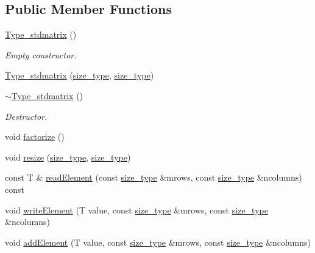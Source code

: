 \subsection*{Public Member Functions}
\begin{DoxyCompactItemize}
\item 
\hyperlink{classlmx_1_1Type__stdmatrix_a16876ff97d835d125990ac31b0e2dfcf}{Type\-\_\-stdmatrix} ()
\begin{DoxyCompactList}\small\item\em Empty constructor. \end{DoxyCompactList}\item 
\hyperlink{classlmx_1_1Type__stdmatrix_a104d1354bb30a767884614ae0fd6f2b5}{Type\-\_\-stdmatrix} (\hyperlink{lmx__mat__data_8h_a49b489a408a211a90e766329c0732d7b}{size\-\_\-type}, \hyperlink{lmx__mat__data_8h_a49b489a408a211a90e766329c0732d7b}{size\-\_\-type})
\item 
\hyperlink{classlmx_1_1Type__stdmatrix_a2f98496533ad90a0563e794af503d182}{$\sim$\-Type\-\_\-stdmatrix} ()
\begin{DoxyCompactList}\small\item\em Destructor. \end{DoxyCompactList}\item 
void \hyperlink{classlmx_1_1Type__stdmatrix_a84777801660805f7e6f1a93861d0c9ac}{factorize} ()
\item 
void \hyperlink{classlmx_1_1Type__stdmatrix_af434c9ba68d71f40e578230225ba828c}{resize} (\hyperlink{lmx__mat__data_8h_a49b489a408a211a90e766329c0732d7b}{size\-\_\-type}, \hyperlink{lmx__mat__data_8h_a49b489a408a211a90e766329c0732d7b}{size\-\_\-type})
\item 
const T \& \hyperlink{classlmx_1_1Type__stdmatrix_a7441d3f1a35bb8ebcdd99f7455186bcc}{read\-Element} (const \hyperlink{lmx__mat__data_8h_a49b489a408a211a90e766329c0732d7b}{size\-\_\-type} \&mrows, const \hyperlink{lmx__mat__data_8h_a49b489a408a211a90e766329c0732d7b}{size\-\_\-type} \&ncolumns) const 
\item 
void \hyperlink{classlmx_1_1Type__stdmatrix_a90b9f72528b9bd122463611c3628a18c}{write\-Element} (T value, const \hyperlink{lmx__mat__data_8h_a49b489a408a211a90e766329c0732d7b}{size\-\_\-type} \&mrows, const \hyperlink{lmx__mat__data_8h_a49b489a408a211a90e766329c0732d7b}{size\-\_\-type} \&ncolumns)
\item 
void \hyperlink{classlmx_1_1Type__stdmatrix_ad77ae15ae864751d41b57be6cb9d3279}{add\-Element} (T value, const \hyperlink{lmx__mat__data_8h_a49b489a408a211a90e766329c0732d7b}{size\-\_\-type} \&mrows, const \hyperlink{lmx__mat__data_8h_a49b489a408a211a90e766329c0732d7b}{size\-\_\-type} \&ncolumns)

\end{DoxyCompactItemize}
